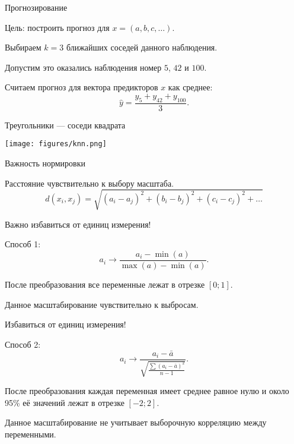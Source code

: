 \begin{frame}{Прогнозирование}

\alert{Цель}: построить прогноз для $x = (a, b, c, \ldots)$.

\pause

Выбираем $k = 3$ ближайших соседей данного наблюдения. 

\pause 

Допустим это оказались наблюдения номер $5$, $42$ и $100$.

\pause

Считаем прогноз для вектора предикторов $x$ как среднее:
\[
\hat y = \frac{y_5 + y_{42} + y_{100}}{3}.
\]
\end{frame}

\begin{frame}{Треугольники — соседи квадрата}

\begin{center}
\texttt{[image: figures/knn.png]}
\end{center}

\end{frame}

\begin{frame}{Важность нормировки}

Расстояние \alert{чувствительно} к выбору масштаба.
\[
d(x_i, x_j) = \sqrt{(a_i - a_j)^2 + (b_i - b_j)^2 + (c_i - c_j)^2 + \ldots}  
\]

\pause

\alert{Важно} избавиться от единиц измерения!

\pause
Способ 1:
\[
a_i \to  \frac{a_i - \min(a)}{\max(a) - \min(a)}.
\]


\pause 

После преобразования все переменные лежат в отрезке $[0;1]$.

\pause

Данное масштабирование чувствительно к выбросам. 

\end{frame}


\begin{frame}{Избавиться от единиц измерения!}

  Способ 2:
  \[
  a_i \to \frac{a_i - \bar a}{\sqrt{\frac{\sum (a_i - \bar a)^2}{n - 1}}}.
  \]
  
  \pause 
  
  После преобразования каждая переменная имеет среднее равное нулю и 
  около 95\% её значений лежат в отрезке $[-2;2]$.
  
  \pause
  
  Данное масштабирование не учитывает выборочную корреляцию между переменными. 
  
\end{frame}



